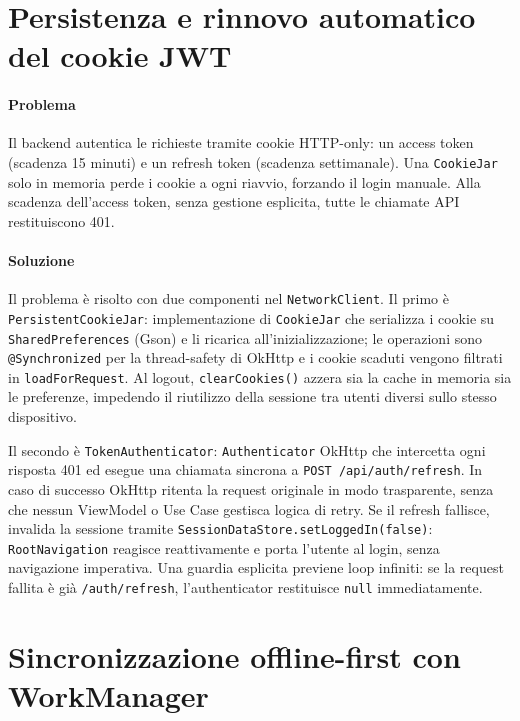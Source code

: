 \documentclass[a4paper,12pt]{report}
\begin{document}
    \section{Persistenza e rinnovo automatico del cookie JWT}
    \label{sec:cookiejar}

    \paragraph{Problema}
    Il backend autentica le richieste tramite cookie HTTP-only: un access token
    (scadenza 15 minuti) e un refresh token (scadenza settimanale). Una
    \texttt{CookieJar} solo in memoria perde i cookie a ogni riavvio, forzando
    il login manuale. Alla scadenza dell'access token, senza gestione esplicita,
    tutte le chiamate API restituiscono 401.

    \paragraph{Soluzione}
    Il problema è risolto con due componenti nel \texttt{NetworkClient}. Il primo è
    \texttt{PersistentCookieJar}: implementazione di \texttt{CookieJar} che serializza
    i cookie su \texttt{SharedPreferences} (Gson) e li ricarica all'inizializzazione;
    le operazioni sono \texttt{@Synchronized} per la thread-safety di OkHttp e i
    cookie scaduti vengono filtrati in \texttt{loadForRequest}. Al logout,
    \texttt{clearCookies()} azzera sia la cache in memoria sia le preferenze,
    impedendo il riutilizzo della sessione tra utenti diversi sullo stesso dispositivo.

    Il secondo è \texttt{TokenAuthenticator}: \texttt{Authenticator} OkHttp che
    intercetta ogni risposta 401 ed esegue una chiamata sincrona a
    \texttt{POST /api/auth/refresh}. In caso di successo OkHttp ritenta la request
    originale in modo trasparente, senza che nessun ViewModel o Use Case gestisca
    logica di retry. Se il refresh fallisce, invalida la sessione tramite
    \texttt{SessionDataStore.setLoggedIn(false)}: \texttt{RootNavigation} reagisce
    reattivamente e porta l'utente al login, senza navigazione imperativa.
    Una guardia esplicita previene loop infiniti: se la request fallita è già
    \texttt{/auth/refresh}, l'authenticator restituisce \texttt{null} immediatamente.

    \section{Sincronizzazione offline-first con WorkManager}
\end{document}
